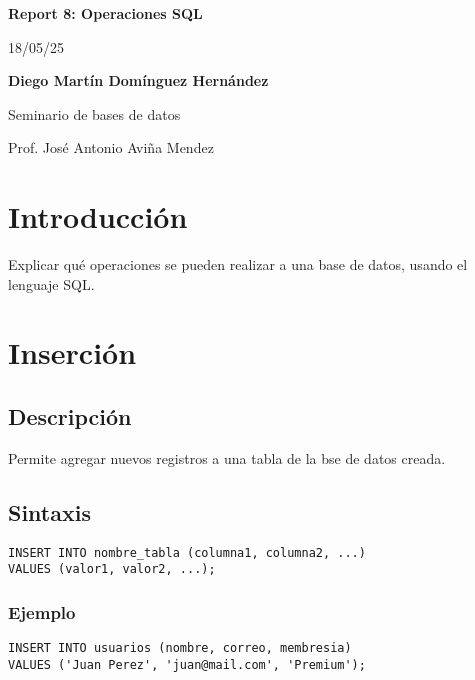 \documentclass[12pt, a4paper]{article}
\begin{document}
\begin{titlepage}
\end{titlepage}

\begin{titlepage}
\begin{center}
 {\Huge\bfseries Report 8: Operaciones SQL\\}
 \vspace{1cm}

 {\huge 18/05/25\\}
 \vspace{2cm}

 {\Large\bfseries Diego Martín Domínguez Hernández}\\[5pt]
 \vspace{2cm}

 {\Large Seminario de bases de datos}\\[5pt]
 \vspace{2cm}

 {\Large Prof. José Antonio Aviña Mendez}\\[5pt]
\end{center}
\end{titlepage}

\newpage
\tableofcontents
\newpage

\section{Introducción}
Explicar qué operaciones se pueden realizar a una base de datos, usando el lenguaje SQL.

\section{Inserción}
\subsection{Descripción}
Permite agregar nuevos registros a una tabla de la bse de datos creada.
\subsection{Sintaxis}
\begin{lstlisting}
INSERT INTO nombre_tabla (columna1, columna2, ...)
VALUES (valor1, valor2, ...);
\end{lstlisting}
\subsubsection{Ejemplo}
\begin{lstlisting}
INSERT INTO usuarios (nombre, correo, membresia)
VALUES ('Juan Perez', 'juan@mail.com', 'Premium');
\end{lstlisting}
\end{document}
